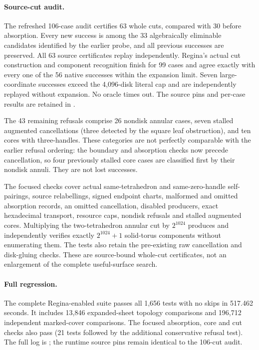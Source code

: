 \paragraph{Source-cut audit.}
The refreshed 106-case audit certifies 63 whole cuts, compared with 30 before
absorption. Every new success is among the 33 algebraically eliminable
candidates identified by the earlier probe, and all previous successes are
preserved. All 63 source certificates replay independently. Regina's actual
cut construction and component recognition finish for 99 cases and agree
exactly with every one of the 56 native successes within the expansion
limit. Seven large-coordinate successes exceed the 4,096-disk literal cap
and are independently replayed without expansion. No oracle times out.
The source pins and per-case results are retained in
.

The 43 remaining refusals comprise 26 nondisk annular cases, seven stalled
augmented cancellations (three detected by the square leaf obstruction),
and ten cores with three-handles. These categories are not perfectly
comparable with the earlier refusal ordering: the boundary and absorption
checks now precede cancellation, so four previously stalled core cases
are classified first by their nondisk annuli. They are not lost successes.

The focused checks cover actual same-tetrahedron and same-zero-handle
self-pairings, source relabellings, signed endpoint charts, malformed and
omitted absorption records, an omitted cancellation, disabled producers,
exact hexadecimal transport, resource caps, nondisk refusals and stalled
augmented cores. Multiplying the two-tetrahedron annular cut by $2^{1024}$
produces and independently verifies exactly $2^{1024}+1$ solid-torus
components without enumerating them. The tests also retain the pre-existing
raw cancellation and disk-gluing checks. These are source-bound whole-cut
certificates, not an enlargement of the complete useful-surface search.

\paragraph{Full regression.}
The complete Regina-enabled suite passes all 1,656 tests with no skips in
517.462 seconds. It includes 13,846 expanded-sheet topology comparisons and
196,712 independent marked-cover comparisons. The focused absorption, core
and cut checks also pass (21 tests followed by the additional conservative
refusal test). The full log is ; the
runtime source pins remain identical to the 106-cut audit.

